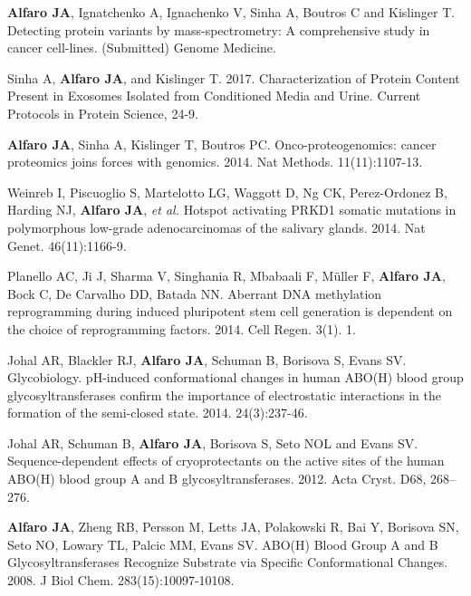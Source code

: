 


\begin{cventries}
	\cventryshort                                                                                                                                                                                                    
	{
	\begin{cvenum}
	\item \textbf{Alfaro JA}, Ignatchenko A, Ignachenko V, Sinha A, Boutros C and Kislinger T. Detecting protein variants by mass-spectrometry: A comprehensive study in cancer cell-lines. (Submitted) Genome Medicine. 
	\item Sinha A, \textbf{Alfaro JA}, and Kislinger T. 2017. Characterization of Protein Content Present in Exosomes Isolated from Conditioned Media and Urine. Current Protocols in Protein Science, 24-9.
	\item \textbf{Alfaro JA}, Sinha A, Kislinger T, Boutros PC. Onco-proteogenomics: cancer proteomics joins forces with genomics.  2014. Nat Methods. 11(11):1107-13.
	\item Weinreb I, Piscuoglio S, Martelotto LG, Waggott D, Ng CK, Perez-Ordonez B, Harding NJ, \textbf{Alfaro JA}, \textit{et al.} Hotspot activating PRKD1 somatic mutations in polymorphous low-grade adenocarcinomas of the salivary glands. 2014. Nat Genet. 46(11):1166-9.
	\item Planello AC, Ji J, Sharma V, Singhania R, Mbabaali F, Müller F, \textbf{Alfaro JA}, Bock C, De Carvalho DD, Batada NN.  Aberrant DNA methylation reprogramming during induced pluripotent stem cell generation is dependent on the choice of reprogramming factors. 2014. Cell Regen. 3(1). 1.
	\item Johal AR, Blackler RJ, \textbf{Alfaro JA}, Schuman B, Borisova S, Evans SV. Glycobiology. pH-induced conformational changes in human ABO(H) blood group glycosyltransferases confirm the importance of electrostatic interactions in the formation of the semi-closed state. 2014. 24(3):237-46.
	\item Johal AR, Schuman B, \textbf{Alfaro JA}, Borisova S, Seto NOL and Evans SV. Sequence-dependent effects of cryoprotectants on the active sites of the human ABO(H) blood group A and B glycosyltransferases. 2012. Acta Cryst. D68, 268–276.
	\item \textbf{Alfaro JA}, Zheng RB, Persson M, Letts JA, Polakowski R, Bai Y, Borisova SN, Seto NO, Lowary TL, Palcic MM, Evans SV. ABO(H) Blood Group A and B Glycosyltransferases Recognize Substrate via Specific Conformational Changes. 2008.  J Biol Chem. 283(15):10097-10108.
    \end{cvenum}
    }
\end{cventries}

